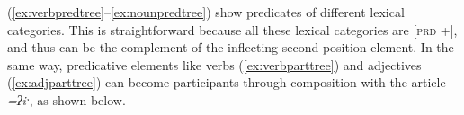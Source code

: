 


(\ref{ex:verbpredtree}--\ref{ex:nounpredtree}) show predicates of different lexical categories. This is straightforward because all these lexical categories are [\textsc{prd} +], and thus can be the complement of the inflecting second position element. In the same way, predicative elements like verbs (\ref{ex:verbparttree}) and adjectives (\ref{ex:adjparttree}) can become participants through composition with the article \textit{=ʔiˑ}, as shown below.


